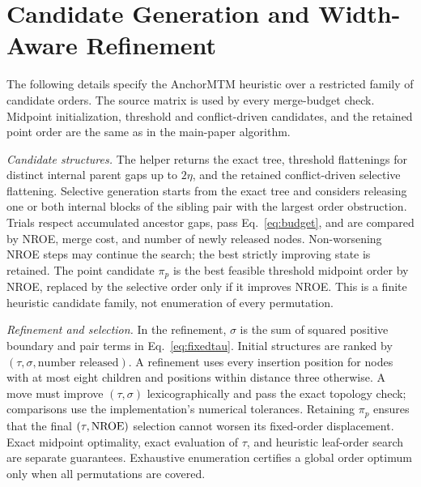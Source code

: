 \documentclass[10pt]{article}
\begin{document}
\begin{algorithm}[tp]
\caption{Optimal Merge Barriers for a Fixed Leaf Order}\label{alg:barriers}
\end{algorithm}

\section{Candidate Generation and Width-Aware Refinement}\label{sec:search}
The following details specify the AnchorMTM heuristic over a restricted family of candidate orders. The source matrix is used by every merge-budget check. Midpoint initialization, threshold and conflict-driven candidates, and the retained point order are the same as in the main-paper algorithm.

\emph{Candidate structures.} The helper returns the exact tree, threshold flattenings for distinct internal parent gaps up to $2\eta$, and the retained conflict-driven selective flattening. Selective generation starts from the exact tree and considers releasing one or both internal blocks of the sibling pair with the largest order obstruction. Trials respect accumulated ancestor gaps, pass Eq.~\ref{eq:budget}, and are compared by NROE, merge cost, and number of newly released nodes. Non-worsening NROE steps may continue the search; the best strictly improving state is retained. The point candidate $\pi_p$ is the best feasible threshold midpoint order by NROE, replaced by the selective order only if it improves NROE. This is a finite heuristic candidate family, not enumeration of every permutation.

\emph{Refinement and selection.} In the refinement, $\sigma$ is the sum of squared positive boundary and pair terms in Eq.~\ref{eq:fixedtau}. Initial structures are ranked by $(\tau,\sigma,\text{number released})$. A refinement uses every insertion position for nodes with at most eight children and positions within distance three otherwise. A move must improve $(\tau,\sigma)$ lexicographically and pass the exact topology check; comparisons use the implementation's numerical tolerances. Retaining $\pi_p$ ensures that the final $(\tau,\mathrm{NROE})$ selection cannot worsen its fixed-order displacement. Exact midpoint optimality, exact evaluation of $\tau$, and heuristic leaf-order search are separate guarantees. Exhaustive enumeration certifies a global order optimum only when all permutations are covered.
\end{document}
